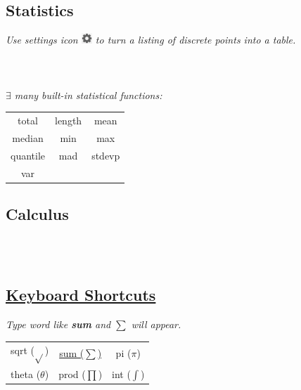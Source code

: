 \subsection*{Statistics}
\textit{Use settings icon \includegraphics[width=4mm,height=4mm,align=c,keepaspectratio]{img/gear.png}{} to turn a listing of discrete points into a table.}\\
 \\
 \\
 \\
\textit{$\exists$ many built-in statistical functions:}\\
\begin{tabular}{c c c}
    total & length & mean \\
    median & min & max \\
    quantile & mad & stdevp \\
    var 
\end{tabular}

\subsection*{Calculus}
\\
 \\


\subsection*{\href{https://learn.desmos.com/keyboard-shortcuts}{Keyboard Shortcuts}}
\textit{Type word like \textbf{sum} and \href{https://www.desmos.com/calculator/yowatouxzl}{$\sum$}  will appear.}\\
\begin{tabular}{c c c}
    sqrt ($\sqrt{}$)  & \href{https://www.desmos.com/calculator/yowatouxzl}{sum ($\sum{}$)} & pi ($\pi$) \\
    theta ($\theta$) & prod ($\prod$) & int ($\int$) \\ 
\end{tabular}



